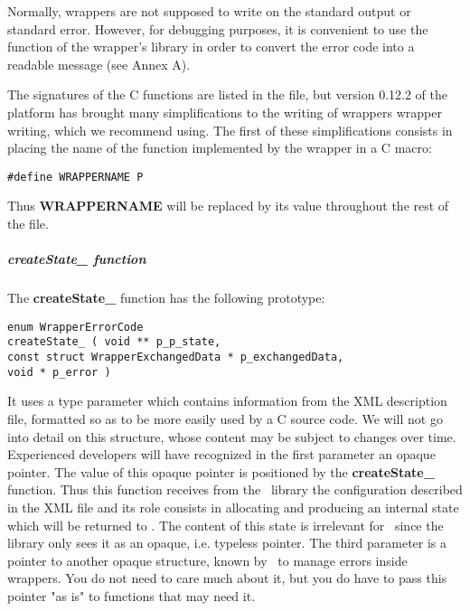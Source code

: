 Normally, wrappers are not supposed to write on the standard output or standard error. However, for debugging purposes, it is convenient to use the  function of the wrapper's library in order to convert the error code into a readable message (see Annex A).

The signatures of the C functions are listed in the  file, but version 0.12.2 of the platform has brought many simplifications to the writing of wrappers wrapper writing, which we recommend using. The first of these simplifications consists in placing the name of the function implemented by the wrapper in a C macro:

\lstset{language=C++, basicstyle=\normalsize}
\begin{lstlisting}[frame=TBRL]
#define WRAPPERNAME P
\end{lstlisting}

Thus {\bf WRAPPERNAME} will be replaced by its value throughout the rest of the file.

\subparagraph{createState\_ function}

The {\bf createState\_} function has the following prototype:

\lstset{language=C++, basicstyle=\normalsize}
\begin{lstlisting}[frame=TBRL]
enum WrapperErrorCode
createState_ ( void ** p_p_state,
const struct WrapperExchangedData * p_exchangedData,
void * p_error )
\end{lstlisting}

It uses a  type parameter which contains information from the XML description file, formatted so as to be more easily used by a C source code. We will not go into detail on this structure, whose content may be subject to changes over time. Experienced developers will have recognized in the first parameter an opaque pointer. The value of this opaque pointer is positioned by the {\bf createState\_} function. Thus this function receives from the \OT\ library the configuration described in the XML file and its role consists in allocating and producing an internal state which will be returned to \OT . The content of this state is irrelevant for \OT\ since the library only sees it as an opaque, i.e. typeless pointer. The third parameter is a pointer to another opaque structure, known by \OT\ to manage errors inside wrappers. You do not need to care much about it, but you do have to pass this pointer "as is" to functions that may need it.

